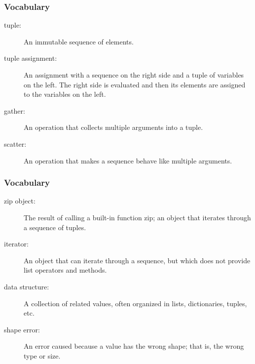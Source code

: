 \documentclass{beamer}
\newcommand{\li}{\item}
\newcommand{\bfr}[1]{\begin{frame}[fragile]\frametitle{{ #1 }}}
\begin{document}
\bfr{Vocabulary}
\begin{description}
\li[tuple:]
An immutable sequence of elements.
\li[tuple assignment:]
An assignment with a sequence on the right side and a tuple of variables on the left. The right side is evaluated and then its elements are assigned to the variables on the left.
\li[gather:]
An operation that collects multiple arguments into a tuple.
\li[scatter:]
An operation that makes a sequence behave like multiple arguments.
\end{description}
\end{frame}

\bfr{Vocabulary}
\begin{description}
\li[zip object:]
The result of calling a built-in function zip; an object that iterates through a sequence of tuples.
\li[iterator:]
An object that can iterate through a sequence, but which does not provide list operators and methods.
\li[data structure:]
A collection of related values, often organized in lists, dictionaries, tuples, etc.
\li[shape error:]
An error caused because a value has the wrong shape; that is, the wrong type or size.
\end{description}
\end{frame}
\end{document}
